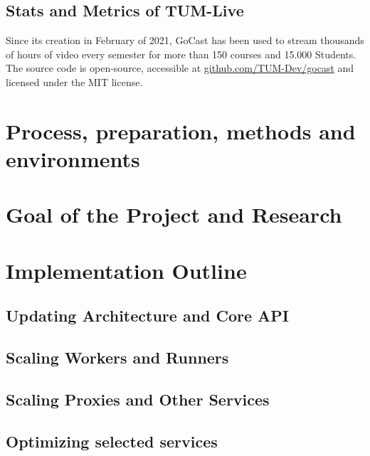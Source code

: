 \newpage

\subsection{Stats and Metrics of TUM-Live}

Since its creation in February of 2021, GoCast has been used to stream thousands of hours of video every semester for more than 150 courses and 15.000 Students. The source code is open-source, accessible at \href{https://github.com/TUM-Dev/gocast}{github.com/TUM-Dev/gocast} and licensed under the MIT license.

\section{Process, preparation, methods and environments}

\section{Goal of the Project and Research}

\section{Implementation Outline}

\subsection{Updating Architecture and Core API}

\subsection{Scaling Workers and Runners}

\subsection{Scaling Proxies and Other Services}

\subsection{Optimizing selected services}

